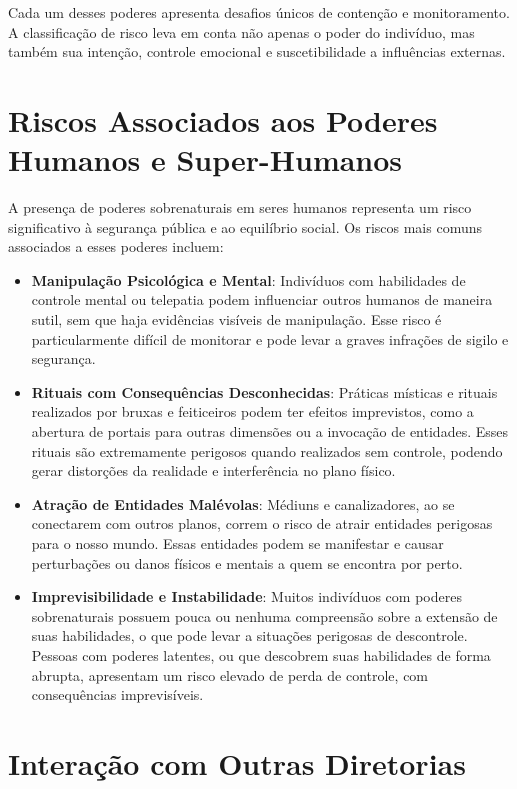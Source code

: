 Cada um desses poderes apresenta desafios únicos de contenção e monitoramento. A classificação de risco leva em conta não apenas o poder do indivíduo, mas também sua intenção, controle emocional e suscetibilidade a influências externas.

\section{Riscos Associados aos Poderes Humanos e Super-Humanos}
A presença de poderes sobrenaturais em seres humanos representa um risco significativo à segurança pública e ao equilíbrio social. Os riscos mais comuns associados a esses poderes incluem:

\begin{itemize}
    \item \textbf{Manipulação Psicológica e Mental}: Indivíduos com habilidades de controle mental ou telepatia podem influenciar outros humanos de maneira sutil, sem que haja evidências visíveis de manipulação. Esse risco é particularmente difícil de monitorar e pode levar a graves infrações de sigilo e segurança.
    \item \textbf{Rituais com Consequências Desconhecidas}: Práticas místicas e rituais realizados por bruxas e feiticeiros podem ter efeitos imprevistos, como a abertura de portais para outras dimensões ou a invocação de entidades. Esses rituais são extremamente perigosos quando realizados sem controle, podendo gerar distorções da realidade e interferência no plano físico.
    \item \textbf{Atração de Entidades Malévolas}: Médiuns e canalizadores, ao se conectarem com outros planos, correm o risco de atrair entidades perigosas para o nosso mundo. Essas entidades podem se manifestar e causar perturbações ou danos físicos e mentais a quem se encontra por perto.
    \item \textbf{Imprevisibilidade e Instabilidade}: Muitos indivíduos com poderes sobrenaturais possuem pouca ou nenhuma compreensão sobre a extensão de suas habilidades, o que pode levar a situações perigosas de descontrole. Pessoas com poderes latentes, ou que descobrem suas habilidades de forma abrupta, apresentam um risco elevado de perda de controle, com consequências imprevisíveis.
\end{itemize}

\section{Interação com Outras Diretorias}

